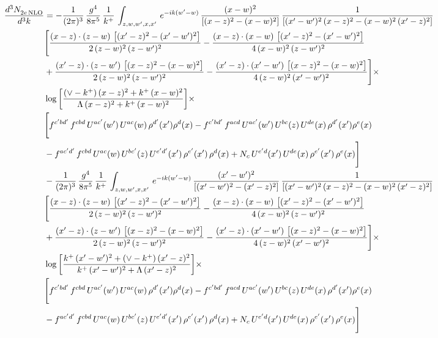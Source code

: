 \documentclass[9pt]{article}
\numberwithin{equation}{section}
\begin{document}
\begin{align}
 \frac{d^{3}N_{2e\,\rm NLO}^{\rm}}{d^{3}k}  & =  -\frac{1}{(2\pi)^{3}}\, \frac{g^{4}}{8\pi^{5}}\,\frac{1}{k^{+}}\,\int_{z,w,w^{\prime},x,x'}\, e^{-ik(w^{\prime}-w)}\,\frac{(x-w)^{2}}{\left[(x-z)^{2}-(x-w)^{2}\right]}\, \frac{1}{\left[(x'-w')^{2}\, (x-z)^{2} - (x-w)^{2}\, (x'-z)^{2}\right]} \notag \\ & \Bigg[\frac{(x-z)\cdot (z-w)\, \left[(x'-z)^{2}-(x'-w')^{2}\right]}{2\, (z-w)^{2}\, (z-w')^{2}}  - \frac{(x-z)\cdot (x-w)\,\left[(x'-z)^{2}-(x'-w')^{2}\right] }{4\,(x-w)^{2}\,(z-w')^{2}}\notag \\ & +\frac{(x'-z)\cdot (z-w')\, \left[(x-z)^{2}-(x-w)^{2}\right]}{2\, (z-w)^{2}\, (z-w')^{2}}-\frac{(x'-z)\cdot (x'-w')\, \left[(x-z)^{2}-(x-w)^{2}\right]}{4\, (z-w)^{2}\,(x'-w')^{2}}\Bigg]\times\,\notag \\ & \log{\left[\frac{(\vee - k^{+})\, (x-z)^{2} + k^{+}\, (x-w)^{2}}{\Lambda\, (x-z)^{2} + k^{+}\, (x-w)^{2}}\right]}\times\,\notag \\ & \Bigg[f^{c'bd'}\,f^{cbd}\, U^{ac'}(w')\,U^{ac}(w)\,\rho^{d'}(x')\rho^{d}(x)- f^{c'bd'}\,f^{acd}\,U^{ac'}(w')\,U^{bc}(z)\,U^{de}(x)\,\rho^{d'}(x')\rho^{e}(x) \notag \\ & -f^{ac'd'}\,f^{cbd}\,U^{ac}(w)\,U^{bc'}(z)\,U^{e'd'}(x')\,\rho^{e'}(x')\,\rho^{d}(x) +N_{c}\,U^{e'd}(x')\,U^{de}(x)\,\rho^{e'}(x')\,\rho^{e}(x)\Bigg]\notag \\ & -\frac{1}{(2\pi)^{3}}\, \frac{g^{4}}{8\pi^{5}}\,\frac{1}{k^{+}}\,\int_{z,w,w^{\prime},x,x'}\, e^{-ik(w^{\prime}-w)}\, \frac{(x'-w')^{2}}{\left[(x'-w')^{2}-(x'-z)^{2}\right]}\, \frac{1}{\left[(x'-w')^{2}\, (x-z)^{2} - (x-w)^{2}\, (x'-z)^{2}\right]}  \notag \\ & \Bigg[\frac{(x-z)\cdot (z-w)\, \left[(x'-z)^{2}-(x'-w')^{2}\right]}{2\, (z-w)^{2}\, (z-w')^{2}}  - \frac{(x-z)\cdot (x-w)\,\left[(x'-z)^{2}-(x'-w')^{2}\right] }{4\,(x-w)^{2}\,(z-w')^{2}}\notag \\ & +\frac{(x'-z)\cdot (z-w')\, \left[(x-z)^{2}-(x-w)^{2}\right]}{2\, (z-w)^{2}\, (z-w')^{2}}-\frac{(x'-z)\cdot (x'-w')\, \left[(x-z)^{2}-(x-w)^{2}\right]}{4\, (z-w)^{2}\,(x'-w')^{2}}\Bigg]\times\,\notag \\ & \log{\left[\frac{k^{+}\, (x'-w')^{2} + (\vee - k^{+})\, (x'-z)^{2}}{k^{+}\, (x'-w')^{2} + \Lambda\, (x'-z)^{2}}\right]}\times\notag \\ & \Bigg[f^{c'bd'}\,f^{cbd}\, U^{ac'}(w')\,U^{ac}(w)\,\rho^{d'}(x')\rho^{d}(x)- f^{c'bd'}\,f^{acd}\,U^{ac'}(w')\,U^{bc}(z)\,U^{de}(x)\,\rho^{d'}(x')\rho^{e}(x) \notag \\ & -f^{ac'd'}\,f^{cbd}\,U^{ac}(w)\,U^{bc'}(z)\,U^{e'd'}(x')\,\rho^{e'}(x')\,\rho^{d}(x) +N_{c}\,U^{e'd}(x')\,U^{de}(x)\,\rho^{e'}(x')\,\rho^{e}(x)\Bigg]
\end{align}
\end{document}
